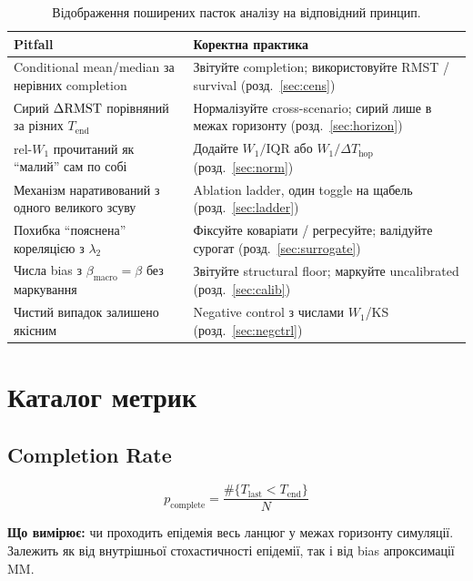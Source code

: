 \documentclass[11pt,a4paper]{article}
\begin{document}
\begin{table}[H]
\centering
\renewcommand{\arraystretch}{1.3}
\begin{tabular}{p{6.2cm}p{7.4cm}}
\toprule
\textbf{Pitfall} & \textbf{Коректна практика} \\
\midrule
Conditional mean/median за нерівних completion & Звітуйте completion; використовуйте RMST / survival (розд.~\ref{sec:cens}) \\
Сирий $\Delta\mathrm{RMST}$ порівняний за різних $T_{\mathrm{end}}$ & Нормалізуйте cross-scenario; сирий лише в межах горизонту (розд.~\ref{sec:horizon}) \\
rel-$W_1$ прочитаний як ``малий'' сам по собі & Додайте $W_1/\mathrm{IQR}$ або $W_1/\Delta T_{\mathrm{hop}}$ (розд.~\ref{sec:norm}) \\
Механізм наративований з одного великого зсуву & Ablation ladder, один toggle на щабель (розд.~\ref{sec:ladder}) \\
Похибка ``пояснена'' кореляцією з $\lambda_2$ & Фіксуйте коваріати / регресуйте; валідуйте сурогат (розд.~\ref{sec:surrogate}) \\
Числа bias з $\beta_{\mathrm{macro}}=\beta$ без маркування & Звітуйте structural floor; маркуйте uncalibrated (розд.~\ref{sec:calib}) \\
Чистий випадок залишено якісним & Negative control з числами $W_1$/KS (розд.~\ref{sec:negctrl}) \\
\bottomrule
\end{tabular}
\caption{Відображення поширених пасток аналізу на відповідний принцип.}
\label{tab:pitfalls}
\end{table}

\section{Каталог метрик}
\label{sec:catalogue}

\subsection{Completion Rate}

\[
  p_{\mathrm{complete}} = \frac{\#\{T_{\mathrm{last}} < T_{\mathrm{end}}\}}{N}
\]

\textbf{Що вимірює:} чи проходить епідемія весь ланцюг
у межах горизонту симуляції.  Залежить як від внутрішньої стохастичності
епідемії, так і від bias апроксимації MM.
\end{document}
